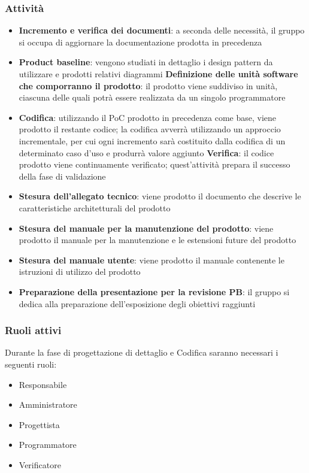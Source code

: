 \subsubsection{Attività}
\begin{itemize}
    \item \textbf{Incremento e verifica dei documenti}: a seconda delle necessità, il gruppo si occupa di aggiornare la documentazione prodotta in precedenza
    \item \textbf{Product baseline}: vengono studiati in dettaglio i design pattern da utilizzare e prodotti relativi diagrammi
        \subitem \textbf{Definizione delle unità software che comporranno il prodotto}: il prodotto viene suddiviso in unità, ciascuna delle quali potrà essere realizzata da un singolo programmatore
    \item \textbf{Codifica}: utilizzando il PoC prodotto in precedenza come base, viene prodotto il restante codice; la codifica avverrà utilizzando un approccio incrementale, per cui ogni incremento sarà costituito dalla codifica di un determinato caso d’uso e produrrà valore aggiunto
        \subitem \textbf{Verifica}: il codice prodotto viene continuamente verificato; quest’attività prepara il successo della fase di validazione
    \item \textbf{Stesura dell’allegato tecnico}: viene prodotto il documento che descrive le caratteristiche architetturali del prodotto
    \item \textbf{Stesura del manuale per la manutenzione del prodotto}: viene prodotto il manuale per la manutenzione e le estensioni future del prodotto
    \item \textbf{Stesura del manuale utente}: viene prodotto il manuale contenente le istruzioni di utilizzo del prodotto
    \item \textbf{Preparazione della presentazione per la revisione PB}: il gruppo si dedica alla preparazione dell’esposizione degli obiettivi raggiunti
\end{itemize}

\subsubsection{Ruoli attivi}
Durante la fase di progettazione di dettaglio e Codifica saranno necessari i seguenti ruoli:
\begin{itemize}
	\item Responsabile
    \item Amministratore
    \item Progettista
    \item Programmatore
    \item Verificatore
\end{itemize}

